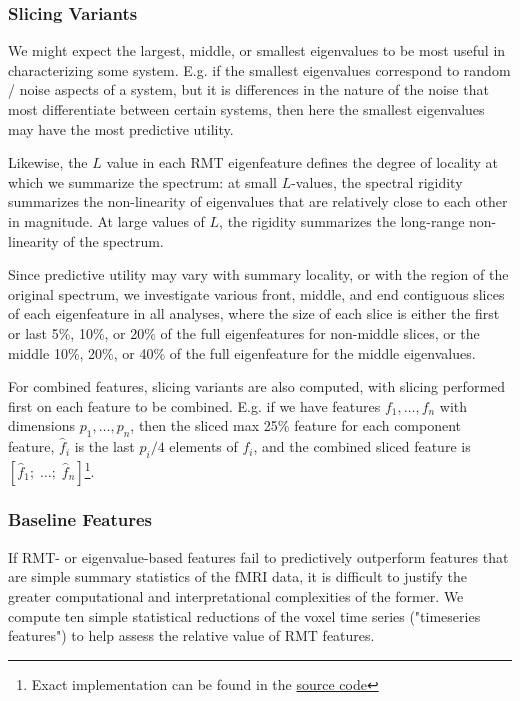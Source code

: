 \documentclass[12pt]{spieman}  %
\begin{document}
\begin{spacing}{2}
\subsubsection{Slicing Variants}

We might expect the largest, middle, or smallest eigenvalues to be most useful
in characterizing some system. E.g. if the smallest eigenvalues correspond to
random / noise aspects of a system, but it is differences in the nature of the
noise that most differentiate between certain systems, then here the smallest
eigenvalues may have the most predictive utility.

Likewise, the \(L\) value in each RMT eigenfeature defines the degree of
locality at which we summarize the spectrum: at small \(L\)-values, the
spectral rigidity summarizes the non-linearity of eigenvalues that are
relatively close to each other in magnitude. At large values of \(L\), the rigidity
summarizes the long-range non-linearity of the spectrum.

Since predictive utility may vary with summary locality, or with the region of
the original spectrum, we investigate various front, middle, and end contiguous
slices of each eigenfeature in all analyses, where the size of each slice is
either the first or last 5\%, 10\%, or 20\% of the full eigenfeatures for
non-middle slices, or the middle 10\%, 20\%, or 40\% of the full eigenfeature for
the middle eigenvalues.

For combined features, slicing variants are also computed, with slicing
performed first on each feature to be combined. E.g. if we have features \(f_1,
\dots,  f_n\) with dimensions \(p_1, \dots, p_n\), then the sliced max 25\%
feature for each component feature, \(\hat{f}_i\) is the last \(p_i / 4\)
elements of \(f_i\), and the combined sliced feature is  \([\hat{f}_1;\;
\dots;\; \hat{f}_n]\)\footnote{Exact implementation can be found in the
\href{https://github.com/DM-Berger/random-matrix-fmri/blob/7c9e4187f582dedee728cd7193b8894d928c2f00/code/rmt/updated\_predict.py\#L182-L213}{source code}}.



\subsubsection{Baseline Features}
\label{sec:baselines}

If RMT- or eigenvalue-based features fail to predictively outperform features
that are simple summary statistics of the fMRI data, it is difficult to justify
the greater computational and interpretational complexities of the former. We
compute ten simple statistical reductions of the voxel time series ("timeseries
features") to help assess the relative value of RMT features.


\end{spacing}
\end{document}

